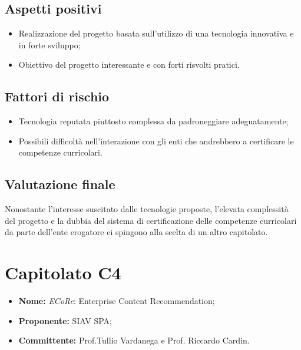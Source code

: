 \documentclass[openany,12pt,a4paper]{report}
\begin{document}
	\subsection{Aspetti positivi}

	\begin{itemize}
		\item Realizzazione del progetto basata sull'utilizzo di una tecnologia innovativa e in forte sviluppo;

		\item Obiettivo del progetto interessante e con forti risvolti pratici.
	\end{itemize}

	\subsection{Fattori di rischio}

	\begin{itemize}
		\item Tecnologia reputata piuttosto complessa da padroneggiare adeguatamente;

		\item Possibili difficoltà nell'interazione con gli enti che andrebbero a certificare le competenze curricolari.
	\end{itemize}

	\subsection{Valutazione finale}

	Nonostante l'interesse suscitato dalle tecnologie proposte, l'elevata complessità del progetto e la dubbia  del sistema di certificazione delle competenze curricolari da parte dell'ente erogatore ci spingono alla scelta di un altro capitolato.


	\section{Capitolato C4}

	\begin{itemize}
		\item \textbf{Nome:} \textit{ECoRe}: Enterprise Content Recommendation;
		\item \textbf{Proponente:} SIAV SPA;
		\item \textbf{Committente:} Prof.Tullio Vardanega e Prof. Riccardo Cardin.
	\end{itemize}
\end{document}
